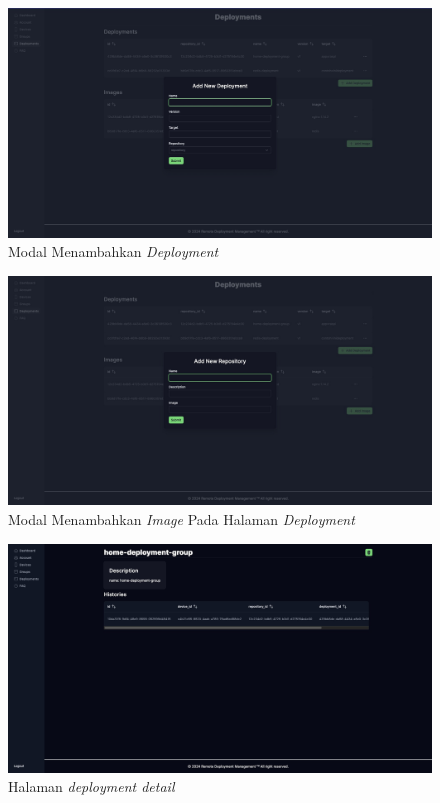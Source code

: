 \begin{figure}[h]
  \centering
  \includegraphics[width=1\textwidth]{resources/chapter-4/dashboard/deployment-page-add-deployment.jpg}
  \caption{Modal Menambahkan \textit{Deployment}}
  \label{fig:halaman-deployment-add-deployment}
\end{figure}

\begin{figure}[h]
  \centering
  \includegraphics[width=1\textwidth]{resources/chapter-4/dashboard/deployment-page-add-repostory.jpg}
  \caption{Modal Menambahkan \textit{Image} Pada Halaman \textit{Deployment}}
  \label{fig:halaman-deployment-add-repostory}
\end{figure}

\begin{figure}[h]
  \centering
  \includegraphics[width=1\textwidth]{resources/chapter-4/dashboard/deployment-detail-page.jpg}
  \caption{Halaman \textit{deployment detail}}
  \label{fig:halaman-deployment-detail}
\end{figure}

